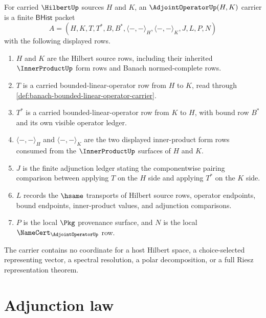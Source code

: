 \begin{definition}
\label{def:adjoint-operator-carrier}
For carried $\HilbertUp$ sources $H$ and $K$, an $\AdjointOperatorUp(H,K)$ carrier is a finite $\mathsf{BHist}$ packet
$$
A=(H,K,T,T^\ast,B,B^\ast,\langle-,-\rangle_H,\langle-,-\rangle_K,J,L,P,N)
$$
with the following displayed rows.
\begin{enumerate}
  \item $H$ and $K$ are the Hilbert source rows, including their inherited $\InnerProductUp$ form rows and Banach normed-complete rows.
  \item $T$ is a carried bounded-linear-operator row from $H$ to $K$, read through \autoref{def:banach-bounded-linear-operator-carrier}.
  \item $T^\ast$ is a carried bounded-linear-operator row from $K$ to $H$, with bound row $B^\ast$ and its own visible operator ledger.
  \item $\langle-,-\rangle_H$ and $\langle-,-\rangle_K$ are the two displayed inner-product form rows consumed from the $\InnerProductUp$ surfaces of $H$ and $K$.
  \item $J$ is the finite adjunction ledger stating the componentwise pairing comparison between applying $T$ on the $H$ side and applying $T^\ast$ on the $K$ side.
  \item $L$ records the $\hsame$ transports of Hilbert source rows, operator endpoints, bound endpoints, inner-product values, and adjunction comparisons.
  \item $P$ is the local $\Pkg$ provenance surface, and $N$ is the local $\NameCert_{\AdjointOperatorUp}$ row.
\end{enumerate}
The carrier contains no coordinate for a host Hilbert space, a choice-selected representing vector, a spectral resolution, a polar decomposition, or a full Riesz representation theorem.
\end{definition}

\section{Adjunction law}
\label{sec:adjoint-operator-adjunction}

